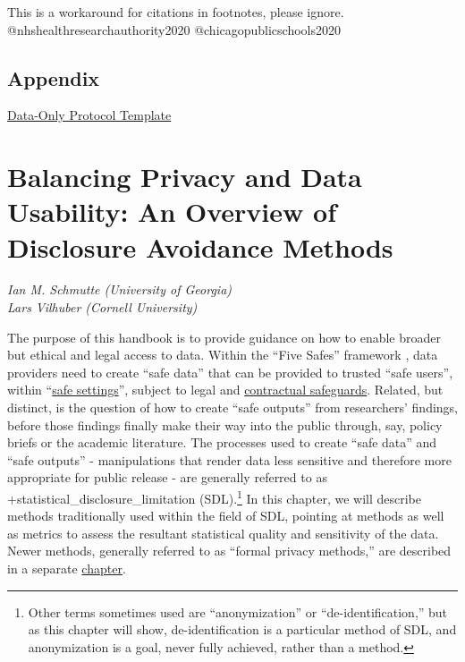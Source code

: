\documentclass[
]{book}
\begin{document}
\begin{invisible}
This is a workaround for citations in footnotes, please ignore.
@nhshealthresearchauthority2020 @chicagopublicschools2020
\end{invisible}

\hypertarget{appendix-1}{%
\section*{Appendix}\label{appendix-1}}

\href{./appendix/irb_appendix.pdf}{Data-Only Protocol Template}

\hypertarget{discavoid}{%
\chapter{Balancing Privacy and Data Usability: An Overview of Disclosure Avoidance Methods}\label{discavoid}}

\emph{Ian M. Schmutte (University of Georgia)}\\
\emph{Lars Vilhuber (Cornell University)}

The purpose of this handbook is to provide guidance on how to enable broader but ethical and legal access to data. Within the ``Five Safes'' framework \citep{desai_five_2016}, data providers need to create ``safe data'' that can be provided to trusted ``safe users'', within ``\protect\hyperlink{security}{safe settings}'', subject to legal and \protect\hyperlink{dua}{contractual safeguards}. Related, but distinct, is the question of how to create ``safe outputs'' from researchers' findings, before those findings finally make their way into the public through, say, policy briefs or the academic literature. The processes used to create ``safe data'' and ``safe outputs'' - manipulations that render data less sensitive and therefore more appropriate for public release - are generally referred to as +statistical\_disclosure\_limitation\textbar{} (SDL).\footnote{Other terms sometimes used are ``anonymization'' or ``de-identification,'' but as this chapter will show, de-identification is a particular method of SDL, and anonymization is a goal, never fully achieved, rather than a method.} In this chapter, we will describe methods traditionally used within the field of SDL, pointing at methods as well as metrics to assess the resultant statistical quality and sensitivity of the data. Newer methods, generally referred to as ``formal privacy methods,'' are described in a separate \protect\hyperlink{diffpriv}{chapter}.
\end{document}

